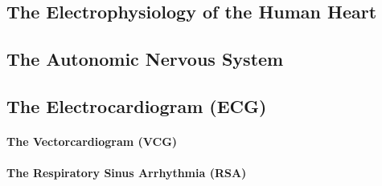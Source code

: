 


\subsection{The Electrophysiology of the Human Heart}
\label{physiology}



\subsection{The Autonomic Nervous System}
\label{ans}



\subsection{The Electrocardiogram (ECG)}
\label{ecg}
\paragraph{The Vectorcardiogram (VCG)}
\label{vcg}
\paragraph{The Respiratory Sinus Arrhythmia (RSA)}
\label{rsa}

